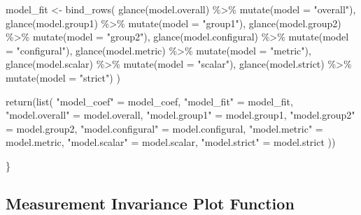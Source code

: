 \documentclass[
  man]{apa6}
\newenvironment{Shaded}{\begin{snugshade}}{\end{snugshade}}
\newcommand{\AttributeTok}[1]{\textcolor[rgb]{0.77,0.63,0.00}{#1}}
\newcommand{\FunctionTok}[1]{\textcolor[rgb]{0.00,0.00,0.00}{#1}}
\newcommand{\NormalTok}[1]{#1}
\newcommand{\OtherTok}[1]{\textcolor[rgb]{0.56,0.35,0.01}{#1}}
\newcommand{\SpecialCharTok}[1]{\textcolor[rgb]{0.00,0.00,0.00}{#1}}
\newcommand{\StringTok}[1]{\textcolor[rgb]{0.31,0.60,0.02}{#1}}
\begin{document}
\begin{Shaded}
\begin{Highlighting}[]
\NormalTok{  model\_fit }\OtherTok{\textless{}{-}} \FunctionTok{bind\_rows}\NormalTok{(}
    \FunctionTok{glance}\NormalTok{(model.overall) }\SpecialCharTok{\%\textgreater{}\%} \FunctionTok{mutate}\NormalTok{(}\AttributeTok{model =} \StringTok{"overall"}\NormalTok{), }
    \FunctionTok{glance}\NormalTok{(model.group1) }\SpecialCharTok{\%\textgreater{}\%} \FunctionTok{mutate}\NormalTok{(}\AttributeTok{model =} \StringTok{"group1"}\NormalTok{), }
    \FunctionTok{glance}\NormalTok{(model.group2) }\SpecialCharTok{\%\textgreater{}\%} \FunctionTok{mutate}\NormalTok{(}\AttributeTok{model =} \StringTok{"group2"}\NormalTok{), }
    \FunctionTok{glance}\NormalTok{(model.configural) }\SpecialCharTok{\%\textgreater{}\%} \FunctionTok{mutate}\NormalTok{(}\AttributeTok{model =} \StringTok{"configural"}\NormalTok{), }
    \FunctionTok{glance}\NormalTok{(model.metric) }\SpecialCharTok{\%\textgreater{}\%} \FunctionTok{mutate}\NormalTok{(}\AttributeTok{model =} \StringTok{"metric"}\NormalTok{), }
    \FunctionTok{glance}\NormalTok{(model.scalar) }\SpecialCharTok{\%\textgreater{}\%} \FunctionTok{mutate}\NormalTok{(}\AttributeTok{model =} \StringTok{"scalar"}\NormalTok{), }
    \FunctionTok{glance}\NormalTok{(model.strict) }\SpecialCharTok{\%\textgreater{}\%} \FunctionTok{mutate}\NormalTok{(}\AttributeTok{model =} \StringTok{"strict"}\NormalTok{)}
\NormalTok{    )}
  
  \FunctionTok{return}\NormalTok{(}\FunctionTok{list}\NormalTok{(}
    \StringTok{"model\_coef"} \OtherTok{=}\NormalTok{ model\_coef,}
    \StringTok{"model\_fit"} \OtherTok{=}\NormalTok{ model\_fit,}
    \StringTok{"model.overall"} \OtherTok{=}\NormalTok{ model.overall,}
    \StringTok{"model.group1"} \OtherTok{=}\NormalTok{ model.group1,}
    \StringTok{"model.group2"} \OtherTok{=}\NormalTok{ model.group2,}
    \StringTok{"model.configural"} \OtherTok{=}\NormalTok{ model.configural,}
    \StringTok{"model.metric"} \OtherTok{=}\NormalTok{ model.metric,}
    \StringTok{"model.scalar"} \OtherTok{=}\NormalTok{ model.scalar,}
    \StringTok{"model.strict"} \OtherTok{=}\NormalTok{ model.strict}
\NormalTok{  ))}
  
\NormalTok{\}}
\end{Highlighting}
\end{Shaded}

\normalsize

\hypertarget{measurement-invariance-plot-function}{%
\subsection{Measurement Invariance Plot Function}\label{measurement-invariance-plot-function}}
\end{document}
